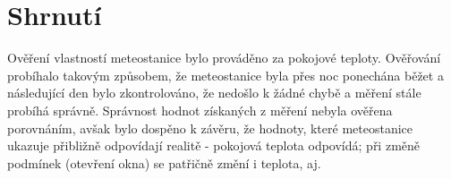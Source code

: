 \section{Shrnutí}
Ověření vlastností meteostanice bylo prováděno za pokojové teploty.
Ověřování probíhalo takovým způsobem, že meteostanice byla přes noc ponechána běžet
a následující den bylo zkontrolováno, že nedošlo k žádné chybě a měření stále
probíhá správně. Správnost hodnot získaných z měření nebyla ověřena
porovnáním, avšak bylo dospěno k závěru, že hodnoty, které meteostanice ukazuje
přibližně odpovídají realitě - pokojová teplota odpovídá; při změně podmínek
(otevření okna) se patřičně změní i teplota, aj.
